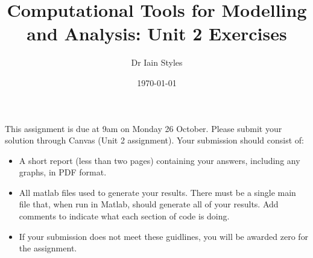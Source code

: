 \documentclass[12pt,a4paper]{tufte-handout}
\title{Computational Tools for Modelling and Analysis: Unit 2 Exercises}
\author{Dr Iain Styles}
\date{\today}
\begin{document}
\maketitle

This assignment is due at 9am on Monday 26 October. Please submit your solution through Canvas (Unit 2 assignment). Your submission should consist of:
\begin{itemize}
  \item A short report (less than two pages) containing your answers, including any graphs, in PDF format.
  \item All matlab files used to generate your results. There must be a single main file that, when run in Matlab, should generate all of your results. Add comments to indicate what each section of code is doing.
  \item If your submission does not meet these guidlines, you will be awarded zero for the assignment.
\end{itemize}
\end{document}
